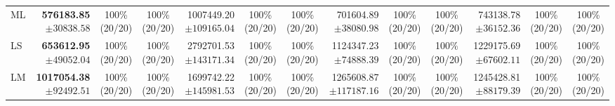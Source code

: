 \begin{table}[!t]
\begin{tabular}{@{}l*{4}{rcc}@{}}
ML & \shortstack[r]{\textbf{576183.85}\\$\pm 30838.58$} & \shortstack[c]{100\%\\(20/20)} & \shortstack[c]{100\%\\(20/20)} & \shortstack[r]{1007449.20\\$\pm 109165.04$} & \shortstack[c]{100\%\\(20/20)} & \shortstack[c]{100\%\\(20/20)} & \shortstack[r]{701604.89\\$\pm 38080.98$} & \shortstack[c]{100\%\\(20/20)} & \shortstack[c]{100\%\\(20/20)} & \shortstack[r]{743138.78\\$\pm 36152.36$} & \shortstack[c]{100\%\\(20/20)} & \shortstack[c]{100\%\\(20/20)} \\
LS & \shortstack[r]{\textbf{653612.95}\\$\pm 49052.04$} & \shortstack[c]{100\%\\(20/20)} & \shortstack[c]{100\%\\(20/20)} & \shortstack[r]{2792701.53\\$\pm 143171.34$} & \shortstack[c]{100\%\\(20/20)} & \shortstack[c]{100\%\\(20/20)} & \shortstack[r]{1124347.23\\$\pm 74888.39$} & \shortstack[c]{100\%\\(20/20)} & \shortstack[c]{100\%\\(20/20)} & \shortstack[r]{1229175.69\\$\pm 67602.11$} & \shortstack[c]{100\%\\(20/20)} & \shortstack[c]{100\%\\(20/20)} \\
LM & \shortstack[r]{\textbf{1017054.38}\\$\pm 92492.51$} & \shortstack[c]{100\%\\(20/20)} & \shortstack[c]{100\%\\(20/20)} & \shortstack[r]{1699742.22\\$\pm 145981.53$} & \shortstack[c]{100\%\\(20/20)} & \shortstack[c]{100\%\\(20/20)} & \shortstack[r]{1265608.87\\$\pm 117187.16$} & \shortstack[c]{100\%\\(20/20)} & \shortstack[c]{100\%\\(20/20)} & \shortstack[r]{1245428.81\\$\pm 88179.39$} & \shortstack[c]{100\%\\(20/20)} & \shortstack[c]{100\%\\(20/20)} \\

\end{tabular}
\end{table}
